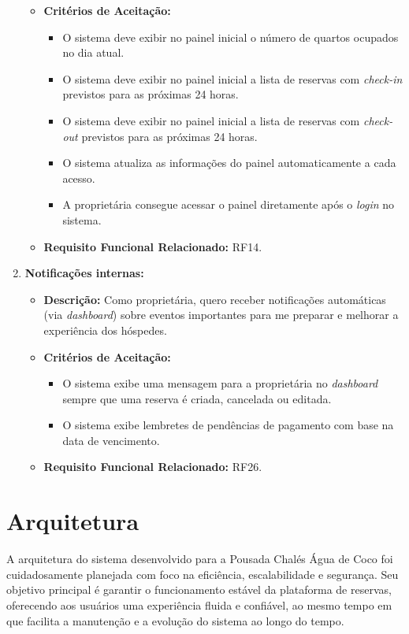 \documentclass[
	12pt,				%
	openany,			%
	oneside,			%
	a4paper,			%
	english,			%
	french,				%
	spanish,			%
	brazil				%
	]{abntex2}
\begin{document}
\begin{enumerate}[label=\textbf{\arabic*.}]
\begin{itemize}
		\item \textbf{Critérios de Aceitação:}
		\begin{itemize}
			\item O sistema deve exibir no painel inicial o número de quartos ocupados no dia atual.
			\item O sistema deve exibir no painel inicial a lista de reservas com \textit{check-in} previstos para as próximas 24 horas.
			\item O sistema deve exibir no painel inicial a lista de reservas com \textit{check-out} previstos para as próximas 24 horas.
			\item O sistema atualiza as informações do painel automaticamente a cada acesso.
			\item A proprietária consegue acessar o painel diretamente após o \textit{login} no sistema.
		\end{itemize}
		\item \textbf{Requisito Funcional Relacionado:} RF14.
	\end{itemize} 
	\item \textbf{Notificações internas:}
	\begin{itemize}
		\item \textbf{Descrição:} Como proprietária, quero receber notificações automáticas (via \textit{dashboard}) sobre eventos importantes para me preparar e melhorar a experiência dos hóspedes.
		\item \textbf{Critérios de Aceitação:}
		\begin{itemize}
			\item O sistema exibe uma mensagem para a proprietária no \textit{dashboard} sempre que uma reserva é criada, cancelada ou editada.
			\item O sistema exibe lembretes de pendências de pagamento com base na data de vencimento.
		\end{itemize}
		\item \textbf{Requisito Funcional Relacionado:} RF26.
	\end{itemize} 
\end{enumerate}
\section{Arquitetura}
A arquitetura do sistema desenvolvido para a Pousada Chalés Água de Coco foi cuidadosamente planejada com foco na eficiência, escalabilidade e segurança. Seu objetivo principal é garantir o funcionamento estável da plataforma de reservas, oferecendo aos usuários uma experiência fluida e confiável, ao mesmo tempo em que facilita a manutenção e a evolução do sistema ao longo do tempo.
\end{document}

